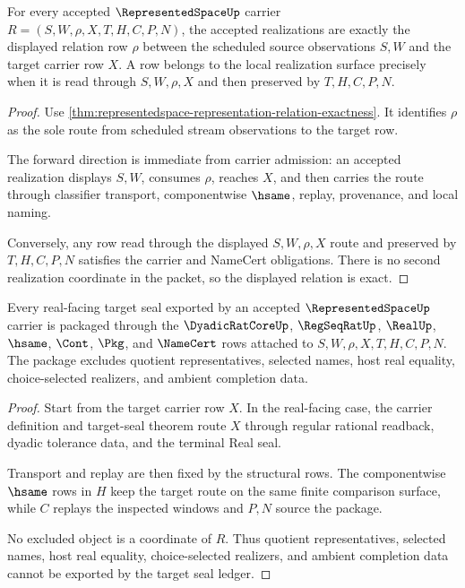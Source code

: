 \begin{theorem}
\label{thm:representedspace-realization-exactness}
For every accepted $\RepresentedSpaceUp$ carrier $R=(S,W,\rho,X,T,H,C,P,N)$, the accepted realizations are exactly the displayed relation row $\rho$ between the scheduled source observations $S,W$ and the target carrier row $X$. A row belongs to the local realization surface precisely when it is read through $S,W,\rho,X$ and then preserved by $T,H,C,P,N$.
\end{theorem}
\begin{proof}
Use \autoref{thm:representedspace-representation-relation-exactness}. It identifies $\rho$ as the sole route from scheduled stream observations to the target row.

The forward direction is immediate from carrier admission: an accepted realization displays $S,W$, consumes $\rho$, reaches $X$, and then carries the route through classifier transport, componentwise $\hsame$, replay, provenance, and local naming.

Conversely, any row read through the displayed $S,W,\rho,X$ route and preserved by $T,H,C,P,N$ satisfies the carrier and NameCert obligations. There is no second realization coordinate in the packet, so the displayed relation is exact.
\end{proof}

\begin{theorem}
\label{thm:representedspace-target-seal-ledger-package}
Every real-facing target seal exported by an accepted $\RepresentedSpaceUp$ carrier is packaged through the $\DyadicRatCoreUp$, $\RegSeqRatUp$, $\RealUp$, $\hsame$, $\Cont$, $\Pkg$, and $\NameCert$ rows attached to $S,W,\rho,X,T,H,C,P,N$. The package excludes quotient representatives, selected names, host real equality, choice-selected realizers, and ambient completion data.
\end{theorem}
\begin{proof}
Start from the target carrier row $X$. In the real-facing case, the carrier definition and target-seal theorem route $X$ through regular rational readback, dyadic tolerance data, and the terminal Real seal.

Transport and replay are then fixed by the structural rows. The componentwise $\hsame$ rows in $H$ keep the target route on the same finite comparison surface, while $C$ replays the inspected windows and $P,N$ source the package.

No excluded object is a coordinate of $R$. Thus quotient representatives, selected names, host real equality, choice-selected realizers, and ambient completion data cannot be exported by the target seal ledger.
\end{proof}

